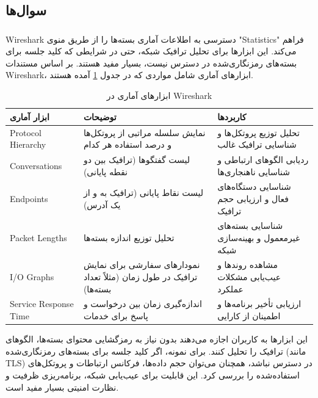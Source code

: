 \documentclass[12pt]{article}
\begin{document}
	
	\subsection{سوال‌ها}
	
	\subsubsection{}
	Wireshark
	 دسترسی به اطلاعات آماری بسته‌ها را از طریق منوی "Statistics" فراهم می‌کند. این ابزارها برای تحلیل ترافیک شبکه، حتی در شرایطی که کلید جلسه برای بسته‌های رمزنگاری‌شده در دسترس نیست، بسیار مفید هستند. بر اساس مستندات \textenglish{Wireshark}، ابزارهای آماری شامل مواردی که در جدول \ref{wire:1} آمده هستند.
	 \begin{table}[h]
	 	\centering
	 	\begin{tabular}{|l|p{4cm}|p{4cm}|}
	 		\hline
	 		ابزار آماری & توضیحات & کاربردها \\
	 		\hline
	 		\textenglish{Protocol Hierarchy} & نمایش سلسله مراتبی از پروتکل‌ها و درصد استفاده هر کدام & تحلیل توزیع پروتکل‌ها و شناسایی ترافیک غالب \\
	 		\hline
	 		\textenglish{Conversations} & لیست گفتگوها (ترافیک بین دو نقطه پایانی) & ردیابی الگوهای ارتباطی و شناسایی ناهنجاری‌ها \\
	 		\hline
	 		\textenglish{Endpoints} & لیست نقاط پایانی (ترافیک به و از یک آدرس) & شناسایی دستگاه‌های فعال و ارزیابی حجم ترافیک \\
	 		\hline
	 		\textenglish{Packet Lengths} & تحلیل توزیع اندازه بسته‌ها & شناسایی بسته‌های غیرمعمول و بهینه‌سازی شبکه \\
	 		\hline
	 		\textenglish{I/O Graphs} & نمودارهای سفارشی برای نمایش ترافیک در طول زمان (مثلاً تعداد بسته‌ها) & مشاهده روندها و عیب‌یابی مشکلات عملکرد \\
	 		\hline
	 		\textenglish{Service Response Time} & اندازه‌گیری زمان بین درخواست و پاسخ برای خدمات & ارزیابی تأخیر برنامه‌ها و اطمینان از کارایی \\
	 		\hline
	 	\end{tabular}
	 	\caption{ابزارهای آماری در Wireshark}
	 	\label{wire:1}
	 \end{table}
	 این ابزارها به کاربران اجازه می‌دهند بدون نیاز به رمزگشایی محتوای بسته‌ها، الگوهای ترافیک را تحلیل کنند. برای نمونه، اگر کلید جلسه برای بسته‌های رمزنگاری‌شده (مانند \textenglish{TLS}) در دسترس نباشد، همچنان می‌توان حجم داده‌ها، فرکانس ارتباطات و پروتکل‌های استفاده‌شده را بررسی کرد. این قابلیت برای عیب‌یابی شبکه، برنامه‌ریزی ظرفیت و نظارت امنیتی بسیار مفید است.
	 
\end{document}
